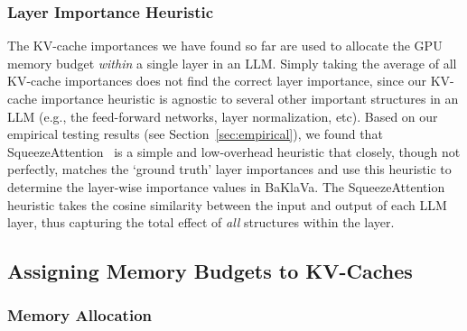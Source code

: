 \subsubsection{Layer Importance Heuristic}
\label{sec:layer_heuristic}
The KV-cache importances we have found so far are used to allocate the GPU memory budget {\em within} a single layer in an LLM. Simply taking the average of all KV-cache importances does not find the correct layer importance, since our KV-cache importance heuristic is agnostic to several other important structures in an LLM (e.g., the feed-forward networks, layer normalization, etc). Based on our empirical testing results (see Section~\ref{sec:empirical}), we found that SqueezeAttention~\cite{squeezeattention} is a simple and low-overhead heuristic that closely, though not perfectly, matches the `ground truth' layer importances and use this heuristic to determine the layer-wise importance values in BaKlaVa. The SqueezeAttention heuristic takes the cosine similarity between the input and output of each LLM layer, thus capturing the total effect of {\em all} structures within the layer. 



\subsection{Assigning Memory Budgets to KV-Caches}

\subsubsection{Memory Allocation}
\label{sec:methods-memory-alloc} 

